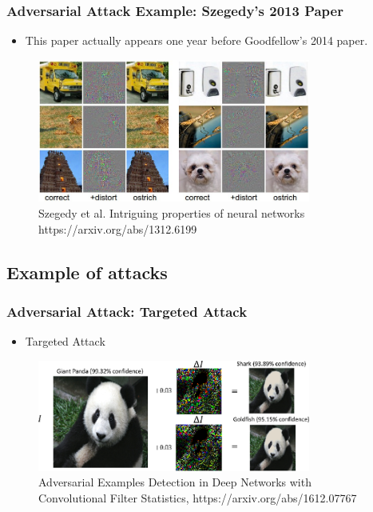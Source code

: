 \documentclass[8pt,dvipsnames]{beamer}
\begin{document}
\begin{frame}
    \frametitle{Adversarial Attack Example: Szegedy’s 2013 Paper}

    \begin{itemize}
        \item This paper actually appears one year before Goodfellow's 2014 paper.
    \end{itemize}
    \begin{figure}[ht]
        \centering
        \includegraphics[width=0.8\textwidth]{imgs/adv_overview_2.png}
        \caption{Szegedy et al. Intriguing properties of neural networks https://arxiv.org/abs/1312.6199}
    \end{figure}
\end{frame}

\subsection{Example of attacks}
\begin{frame}
    \frametitle{Adversarial Attack: Targeted Attack}
    \begin{itemize}
        \item Targeted Attack
    \end{itemize}
    \begin{figure}[ht]
        \centering
        \includegraphics[width=0.8\textwidth]{imgs/adv_overview_3.png}
        \caption{Adversarial Examples Detection in Deep Networks with Convolutional Filter Statistics, https://arxiv.org/abs/1612.07767}
    \end{figure}
\end{frame}
\end{document}
